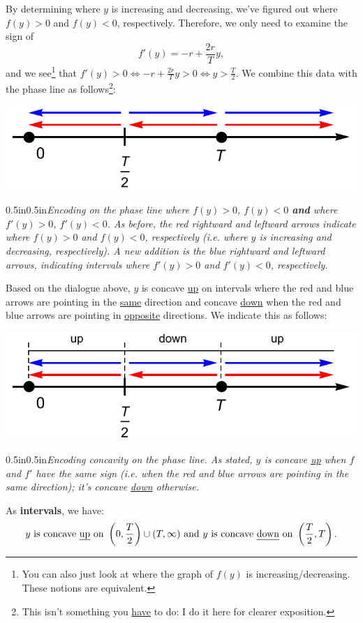 \documentclass[12pt]{article}
\theoremstyle{definition}
\theoremstyle{underl}
\newcommand{\capt}[1]{\begin{adjustwidth}{0.5in}{0.5in}\centering\small\textit{#1}\end{adjustwidth}}
\begin{document}
	By determining where $y$ is increasing and decreasing, we've figured out where $f(y)>0$ and $f(y)<0$, respectively. Therefore, we only need to examine the sign of
	$$f'(y)=-r+\frac{2r}{T}y,$$
	and we see\footnote{You can also just look at where the graph of $f(y)$ is increasing/decreasing. These notions are equivalent.} that $f'(y)>0\iff -r+\frac{2r}{T}y>0\iff y>\frac{T}{2}$. We combine this data with the phase line as follows\footnote{This isn't something you \ul{have} to do: I do it here for clearer exposition.}:
	\begin{center}
		\includegraphics[align=c,scale=0.75]{Ex1_Phase_4}
		\vspace{1.5mm}
		\capt{Encoding on the phase line where $f(y)>0$, $f(y)<0$ \textbf{and} where $f'(y)>0$, $f'(y)<0$. As before, the red rightward and leftward arrows indicate where $f(y)>0$ and $f(y)<0$, respectively (i.e. where $y$ is increasing and decreasing, respectively). A new addition is the blue rightward and leftward arrows, indicating intervals where $f'(y)>0$ and $f'(y)<0$, respectively.}
	\end{center}

	Based on the dialogue above, $y$ is concave \ul{up} on intervals where the red and blue arrows are pointing in the \ul{same} direction and concave \ul{down} when the red and blue arrows are pointing in \ul{opposite} directions. We indicate this as follows:
	\begin{center}
		\includegraphics[align=c,scale=0.875]{Ex1_Phase_5}
		\vspace{1.5mm}
		\capt{Encoding concavity on the phase line. As stated, $y$ is concave \ul{up} when $f$ and $f'$ have the same sign (i.e. when the red and blue arrows are pointing in the same direction); it's concave \ul{down} otherwise.}
	\end{center}
	As \textbf{intervals}, we have:
	$$y\text{ is concave \ul{up} on }\left(0,\frac{T}{2}\right)\cup(T,\infty)\text{ and }y\text{ is concave \ul{down} on }\left(\frac{T}{2},T\right).$$
	
\end{document}
